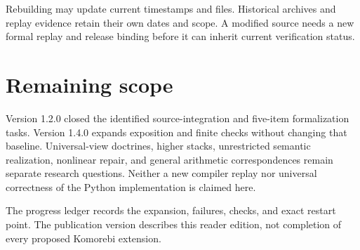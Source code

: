 \documentclass[11pt]{article}
\begin{document}
Rebuilding may update current timestamps and files. Historical archives and replay evidence retain their own dates and scope. A modified source needs a new formal replay and release binding before it can inherit current verification status.

\section{Remaining scope}
Version 1.2.0 closed the identified source-integration and five-item formalization tasks. Version 1.4.0 expands exposition and finite checks without changing that baseline. Universal-view doctrines, higher stacks, unrestricted semantic realization, nonlinear repair, and general arithmetic correspondences remain separate research questions. Neither a new compiler replay nor universal correctness of the Python implementation is claimed here.

The progress ledger records the expansion, failures, checks, and exact restart point. The publication version describes this reader edition, not completion of every proposed Komorebi extension.
\end{document}
